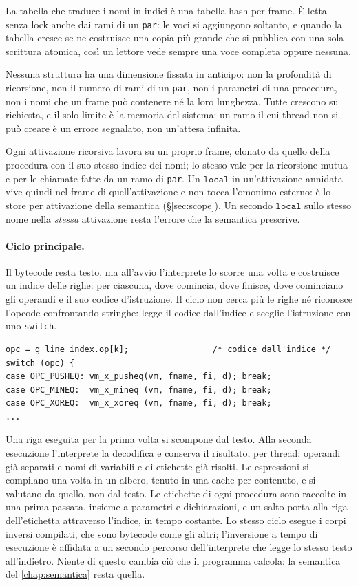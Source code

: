 La tabella che traduce i nomi in indici è una tabella hash per frame. È letta
senza lock anche dai rami di un \texttt{par}: le voci si aggiungono soltanto, e
quando la tabella cresce se ne costruisce una copia più grande che si pubblica
con una sola scrittura atomica, così un lettore vede sempre una voce completa
oppure nessuna.

Nessuna struttura ha una dimensione fissata in anticipo: non la profondità di
ricorsione, non il numero di rami di un \texttt{par}, non i parametri di una
procedura, non i nomi che un frame può contenere né la loro lunghezza. Tutte
crescono su richiesta, e il solo limite è la memoria del sistema: un ramo il
cui thread non si può creare è un errore segnalato, non un'attesa infinita.

Ogni attivazione ricorsiva lavora su un proprio frame, clonato da quello della
procedura con il suo stesso indice dei nomi; lo stesso vale per la ricorsione
mutua e per le chiamate fatte da un ramo di \texttt{par}. Un $\mathtt{local}$
in un'attivazione annidata vive quindi nel frame di quell'attivazione e non
tocca l'omonimo esterno: è lo store per attivazione della semantica
(\S\ref{sec:scope}). Un secondo $\mathtt{local}$ sullo stesso nome nella
\emph{stessa} attivazione resta l'errore che la semantica prescrive.

\paragraph{Ciclo principale.} Il bytecode resta testo, ma all'avvio
l'interprete lo scorre una volta e costruisce un indice delle righe: per
ciascuna, dove comincia, dove finisce, dove cominciano gli operandi e il suo
codice d'istruzione. Il ciclo non cerca più le righe né riconosce l'opcode
confrontando stringhe: legge il codice dall'indice e sceglie l'istruzione con
uno \texttt{switch}.

\begin{lstlisting}
opc = g_line_index.op[k];                 /* codice dall'indice */
switch (opc) {
case OPC_PUSHEQ: vm_x_pusheq(vm, fname, fi, d); break;
case OPC_MINEQ:  vm_x_mineq (vm, fname, fi, d); break;
case OPC_XOREQ:  vm_x_xoreq (vm, fname, fi, d); break;
...
\end{lstlisting}

\noindent
Una riga eseguita per la prima volta si scompone dal testo. Alla seconda
esecuzione l'interprete la decodifica e conserva il risultato, per thread:
operandi già separati e nomi di variabili e di etichette già risolti. Le
espressioni si compilano una volta in un albero, tenuto in una cache per
contenuto, e si valutano da quello, non dal testo. Le etichette di ogni
procedura sono raccolte in una prima passata, insieme a parametri e
dichiarazioni, e un salto porta alla riga dell'etichetta attraverso l'indice,
in tempo costante. Lo stesso ciclo esegue i corpi inversi compilati, che sono
bytecode come gli altri; l'inversione a tempo di esecuzione è affidata a un
secondo percorso dell'interprete che legge lo stesso testo all'indietro. Niente
di questo cambia ciò che il programma calcola: la semantica del
\cref{chap:semantica} resta quella.

